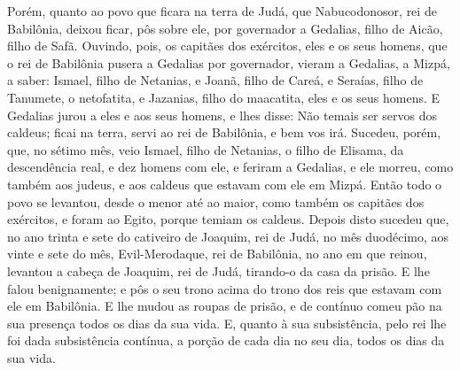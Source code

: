 Porém, quanto ao povo que ficara na terra de Judá, que
Nabucodonosor, rei de Babilônia, deixou ficar, pôs sobre ele, por
governador a Gedalias, filho de Aicão, filho de Safã.
Ouvindo, pois, os capitães dos exércitos, eles e os seus
homens, que o rei de Babilônia pusera a Gedalias por governador,
vieram a Gedalias, a Mizpá, a saber: Ismael, filho de Netanias, e
Joanã, filho de Careá, e Seraías, filho de Tanumete, o netofatita, e
Jazanias, filho do maacatita, eles e os seus homens. E
Gedalias jurou a eles e aos seus homens, e lhes disse: Não temais
ser servos dos caldeus; ficai na terra, servi ao rei de Babilônia, e
bem vos irá. Sucedeu, porém, que, no sétimo mês, veio Ismael,
filho de Netanias, o filho de Elisama, da descendência real, e dez
homens com ele, e feriram a Gedalias, e ele morreu, como também aos
judeus, e aos caldeus que estavam com ele em Mizpá. Então
todo o povo se levantou, desde o menor até ao maior, como também os
capitães dos exércitos, e foram ao Egito, porque temiam os caldeus.
Depois disto sucedeu que, no ano trinta e sete do cativeiro
de Joaquim, rei de Judá, no mês duodécimo, aos vinte e sete do mês,
Evil-Merodaque, rei de Babilônia, no ano em que reinou, levantou a
cabeça de Joaquim, rei de Judá, tirando-o da casa da prisão.
E lhe falou benignamente; e pôs o seu trono acima do trono
dos reis que estavam com ele em Babilônia. E lhe mudou as
roupas de prisão, e de contínuo comeu pão na sua presença todos os
dias da sua vida. E, quanto à sua subsistência, pelo rei lhe
foi dada subsistência contínua, a porção de cada dia no seu dia,
todos os dias da sua vida.

